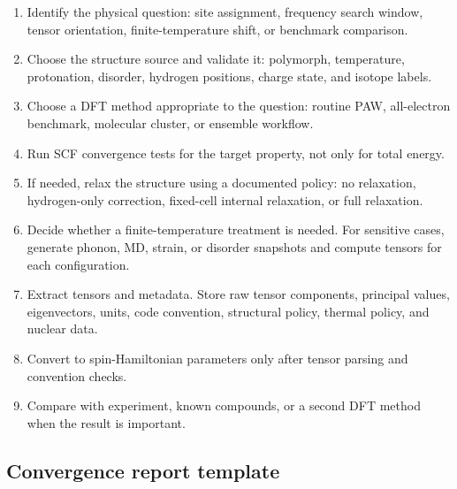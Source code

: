 \documentclass[11pt]{article}
\begin{document}
\begin{enumerate}
\item Identify the physical question: site assignment, frequency search window, tensor orientation, finite-temperature shift, or benchmark comparison.
\item Choose the structure source and validate it: polymorph, temperature, protonation, disorder, hydrogen positions, charge state, and isotope labels.
\item Choose a DFT method appropriate to the question: routine PAW, all-electron benchmark, molecular cluster, or ensemble workflow.
\item Run SCF convergence tests for the target property, not only for total energy.
\item If needed, relax the structure using a documented policy: no relaxation, hydrogen-only correction, fixed-cell internal relaxation, or full relaxation.
\item Decide whether a finite-temperature treatment is needed.  For sensitive cases, generate phonon, MD, strain, or disorder snapshots and compute tensors for each configuration.
\item Extract tensors and metadata.  Store raw tensor components, principal values, eigenvectors, units, code convention, structural policy, thermal policy, and nuclear data.
\item Convert to spin-Hamiltonian parameters only after tensor parsing and convention checks.
\item Compare with experiment, known compounds, or a second DFT method when the result is important.
\end{enumerate}

\subsection{Convergence report template}
\end{document}
